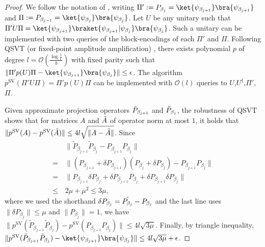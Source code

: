 \documentclass{article}
\theoremstyle{plain}
\theoremstyle{plain}
\theoremstyle{plain}
\theoremstyle{plain}
\theoremstyle{plain}
\theoremstyle{plain}
\theoremstyle{plain}
\begin{document}
\begin{proof}
    

    We follow the notation of \cite{Gilyen_2019singularvalue}, writing $\Pi' := P_{\beta_j} = \ket{\psi_{\beta_{j+1}}}\bra{\psi_{\beta_{j+1}}}$ and $\Pi := P_{\beta_{j-1}} = \ket{\psi_{\beta_{j}}}\bra{\psi_{\beta_{j}}}$.
    Let $U$ be any unitary such that $\Pi' U \Pi = \ket{\psi_{\beta_{j+1}}} \braket{\psi_{\beta_{j+1}} | \psi_{\beta_j}} \bra{\psi_{\beta_j}}$. Such a unitary can be implemented with two queries of the block-encodings of each $\Pi'$ and $\Pi$. Following QSVT (or fixed-point amplitude amplification) \cite[Theorem 26, 27]{Gilyen_2019singularvalue}, there exists polynomial $p$ of degree $l = \mathcal{O} ( \frac{\log\frac{1}{\epsilon}}{b})$ with fixed parity such that $\| \Pi' p(U) \Pi -  \ket{\psi_{\beta_{j+1}}}\bra{\psi_{\beta_j}}\| \le \epsilon$. The algorithm $p^{\text{SV}}( \Pi' U \Pi ) = \Pi' p(U) \Pi$ can be implemented with $\mathcal{O}(l)$ queries to $U$,$U^\dag$,$\Pi'$,$\Pi$.
    
    Given approximate projection operators $\Tilde{P}_{\beta_{j+1}}$ and $\Tilde{P}_{\beta_{j}}$, the robustness of QSVT \cite[Lemma 22]{Gilyen_2019singularvalue} shows that for matrices $A$ and $\Tilde{A}$ of operator norm at most $1$, it holds that $\|p^{\text{SV}}(A) - p^{\text{SV}}(\Tilde{A})\| \le 4l \sqrt{\|A - \Tilde{A}\|}$. Since 
    \begin{equation}
        \begin{aligned}
        & \| \tilde{P}_{\beta_{j+1}}\tilde{P}_{\beta_j} - P_{\beta_{j+1}} P_{\beta_j} \| \\
        = \, & \| (P_{\beta_{j+1}} + \delta P_{\beta_{j+1}}) (P_{\beta_j} + \delta P_{\beta_j}) - P_{\beta_{j+1}} P_{\beta_j}\| \\
        = \, & \| P_{\beta_{j+1}} \delta P_{\beta_j} + \delta P_{\beta_{j+1}} P_{\beta_j} + \delta P_{\beta_{j+1}} \delta P_{\beta_j} \| \\
        \le \,& 2\mu + \mu^2 \le 3\mu,
        \end{aligned}
    \end{equation} where we used the shorthand $\delta P_{\beta_j} = \Tilde{P_{\beta_j}} - P_{\beta_j}$ and the last line uses $\|\delta P_{\beta_j}\| \le \mu$ and $\|P_{\beta_j}\| = 1$, we have $\|p^{\text{SV}}(\tilde{P}_{\beta_{j+1}}\tilde{P}_{\beta_j}) - p^{\text{SV}}({P}_{\beta_{j+1}}{P}_{\beta_j})\| \le 4l \sqrt{3\mu}$. Finally, by triangle inequality, $\|p^{\text{SV}}(\tilde{P}_{\beta_{j+1}}\tilde{P}_{\beta_j}) - \ket{\psi_{\beta_{j+1}}} \bra{\psi_{\beta_{j}}}\| \le 4l\sqrt{3\mu} + \epsilon$.
\end{proof}
\end{document}
